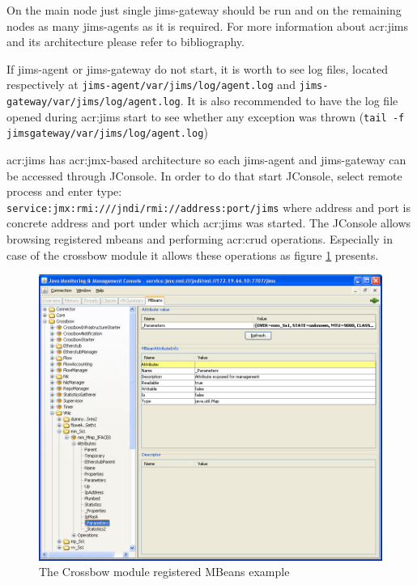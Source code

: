 \documentclass[11pt,openany]{book}
\begin{document}
        On the main node just single jims-gateway should be run and on the remaining nodes as many jims-agents as it is
        required. For more information about \gls{acr:jims} and its architecture please refer to bibliography.

        If jims-agent or jims-gateway do not start, it is worth to see log files, located respectively at
        \texttt{jims-agent/var/jims/log/agent.log} and \texttt{jims-gateway/var/jims/log/agent.log}. It is also
        recommended to have the log file opened during \gls{acr:jims} start to see whether any exception was thrown
        (\texttt{tail -f jims\-gateway/var/jims/log/agent.log})

        \gls{acr:jims} has \gls{acr:jmx}-based architecture so each jims-agent and jims-gateway can be accessed through
        JConsole. In order to do that start JConsole, select remote process and enter type: \\
        \texttt{service:jmx:rmi:///jndi/rmi://address:port/jims} where address and port is concrete address and port under
        which \gls{acr:jims} was started. The JConsole allows browsing registered mbeans and performing \gls{acr:crud}
        operations. Especially in case of the crossbow module it allows these operations as figure
        \ref{fig:impl:xbow-jconsole} presents.

        \begin{figure}[H]
          \centering
          \includegraphics[width=1.0\textwidth]{img/impl/jconsole.png}

          \caption{The Crossbow module registered MBeans example}
          \label{fig:impl:xbow-jconsole}
        \end{figure}
\end{document}
